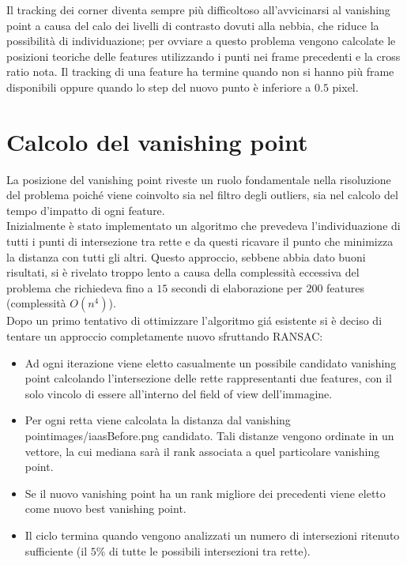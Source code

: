 \documentclass[12pt]{report}
\begin{document}
\noindent Il tracking dei corner diventa sempre pi\`u difficoltoso all'avvicinarsi al vanishing point a causa del calo dei livelli di contrasto dovuti alla nebbia, che riduce la possibilit\`a di individuazione; per ovviare a questo problema vengono calcolate le posizioni teoriche delle features utilizzando i punti nei frame precedenti e la cross ratio nota. Il tracking di una feature ha termine quando non si hanno pi\`u frame disponibili oppure quando lo step del nuovo punto \`e inferiore a $0.5$ pixel.

\section{Calcolo del vanishing point}
La posizione del vanishing point riveste un ruolo fondamentale nella risoluzione del problema poich\'e viene coinvolto sia nel filtro degli outliers, sia nel calcolo del tempo d'impatto di ogni feature.\\

\noindent Inizialmente \`e stato implementato un algoritmo che prevedeva l'individuazione di tutti i punti di intersezione tra rette e da questi ricavare il punto che minimizza la distanza con tutti gli altri. Questo approccio, sebbene abbia dato buoni risultati, si \`e rivelato troppo lento a causa della complessit\`a eccessiva del problema che richiedeva fino a $15$ secondi di elaborazione per $200$ features (complessit\`a $O\left(n^4\right)$).\\

\noindent Dopo un primo tentativo di ottimizzare l'algoritmo gi\'a esistente si \`e deciso di tentare un approccio completamente nuovo sfruttando RANSAC:

\begin{itemize}
\item	Ad ogni iterazione viene eletto casualmente un possibile candidato vanishing point calcolando l'intersezione delle rette rappresentanti due features, con il solo vincolo di essere all'interno del field of view dell'immagine.
\item	Per ogni retta viene calcolata la distanza dal vanishing pointimages/iaasBefore.png candidato. Tali distanze vengono ordinate in un vettore, la cui mediana sar\`a il rank associata a quel particolare vanishing point.
\item	Se il nuovo vanishing point ha un rank migliore dei precedenti viene eletto come nuovo best vanishing point.
\item	Il ciclo termina quando vengono analizzati un numero di intersezioni ritenuto sufficiente (il $5\%$ di tutte le possibili intersezioni tra rette).
\end{itemize}
\end{document}
